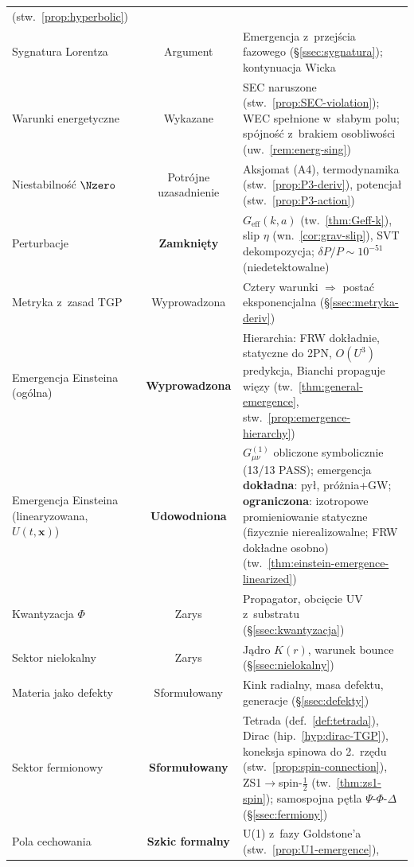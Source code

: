 \begin{center}
\begin{tabular}{@{}>{\raggedright}p{3.5cm}cp{8cm}@{}}
  (stw.~\ref{prop:hyperbolic}) \\
Sygnatura Lorentza & Argument &
  Emergencja z~przej\'scia fazowego
  (\S\ref{ssec:sygnatura}); kontynuacja Wicka \\
Warunki energetyczne & Wykazane &
  SEC naruszone (stw.~\ref{prop:SEC-violation});
  WEC spe\l{}nione w~s\l{}abym polu;
  sp\'ojno\'s\'c z~brakiem osobliwo\'sci
  (uw.~\ref{rem:energ-sing}) \\
Niestabilno\'s\'c $\Nzero$ & Potr\'ojne uzasadnienie &
  Aksjomat (A4), termodynamika (stw.~\ref{prop:P3-deriv}),
  potencja\l{} (stw.~\ref{prop:P3-action}) \\
Perturbacje & \textbf{Zamkni\k{e}ty} &
  $G_{\mathrm{eff}}(k,a)$ (tw.~\ref{thm:Geff-k}),
  slip $\eta$ (wn.~\ref{cor:grav-slip}),
  SVT dekompozycja;
  $\delta P/P \sim 10^{-51}$ (niedetektowalne) \\
Metryka z~zasad TGP & Wyprowadzona &
  Cztery warunki $\Rightarrow$ posta\'c eksponencjalna
  (\S\ref{ssec:metryka-deriv}) \\
Emergencja Einsteina (og\'olna) & \textbf{Wyprowadzona} &
  Hierarchia: FRW dok\l{}adnie, statyczne do 2PN,
  $O(U^3)$ predykcja, Bianchi propaguje wi\k{e}zy
  (tw.~\ref{thm:general-emergence},
  stw.~\ref{prop:emergence-hierarchy}) \\
Emergencja Einsteina (linearyzowana, $U(t,\mathbf{x})$) &
  \textbf{Udowodniona} &
  $G^{(1)}_{\mu\nu}$ obliczone symbolicznie (13/13 PASS);
  emergencja \textbf{dok\l{}adna}: py\l{}, pr\'o\.znia+GW;
  \textbf{ograniczona}: izotropowe promieniowanie statyczne
  (fizycznie nierealizowalne; FRW dok\l{}adne osobno)
  (tw.~\ref{thm:einstein-emergence-linearized}) \\
Kwantyzacja $\Phi$ & Zarys &
  Propagator, obci\k{e}cie UV z~substratu
  (\S\ref{ssec:kwantyzacja}) \\
Sektor nielokalny & Zarys &
  J\k{a}dro $K(r)$, warunek bounce
  (\S\ref{ssec:nielokalny}) \\
Materia jako defekty & Sformu\l{}owany &
  Kink radialny, masa defektu, generacje
  (\S\ref{ssec:defekty}) \\
Sektor fermionowy & \textbf{Sformu\l{}owany} &
  Tetrada (def.~\ref{def:tetrada}), Dirac (hip.~\ref{hyp:dirac-TGP}),
  koneksja spinowa do 2.\ rz\k{e}du (stw.~\ref{prop:spin-connection}),
  ZS1$\to$spin-$\frac{1}{2}$ (tw.~\ref{thm:zs1-spin});
  samospojna p\k{e}tla $\Psi$-$\Phi$-$\Delta$
  (\S\ref{ssec:fermiony}) \\
Pola cechowania & \textbf{Szkic formalny} &
  U(1) z~fazy Goldstone'a (stw.~\ref{prop:U1-emergence}),

\end{tabular}
\end{center}
